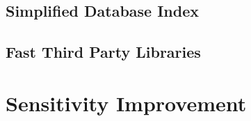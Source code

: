 \subsection{Simplified Database Index}

\subsection{Fast Third Party Libraries}

\section{Sensitivity Improvement}
